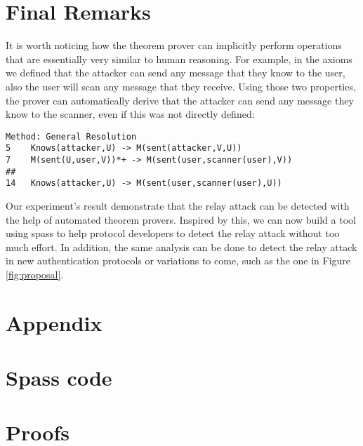 \documentclass{article}
\begin{document}
\section{Final Remarks}
	It is worth noticing how the theorem prover can implicitly perform operations
	that are essentially very similar to human reasoning. For example, in the 
	axioms we defined that the attacker can send any message that they know to the user,
	also the user will scan any message that they receive. Using those two properties,
	the prover can automatically derive that the attacker can send any message they know
	to the scanner, even if this was not directly defined:
\lstset{basicstyle=\ttfamily\footnotesize,breaklines=true}
\begin{lstlisting}[frame=single]
Method: General Resolution
5	 Knows(attacker,U) -> M(sent(attacker,V,U))
7	 M(sent(U,user,V))*+ -> M(sent(user,scanner(user),V))
##
14	 Knows(attacker,U) -> M(sent(user,scanner(user),U))
\end{lstlisting}

	Our experiment's result demonstrate that the relay attack can be detected
	with the help of automated theorem provers. 
	Inspired by this, we can now build a tool using spass to
	help protocol developers to detect the relay attack without too much
	effort. In addition, the same analysis can be done to detect the relay
	attack in new authentication protocols or variations to come, such as 
	the one in Figure \ref{fig:proposal}.

\section{Appendix}
\appendix

\section{Spass code}
\lstset{basicstyle=\ttfamily\footnotesize,breaklines=true}



\section{Proofs}






\end{document}
